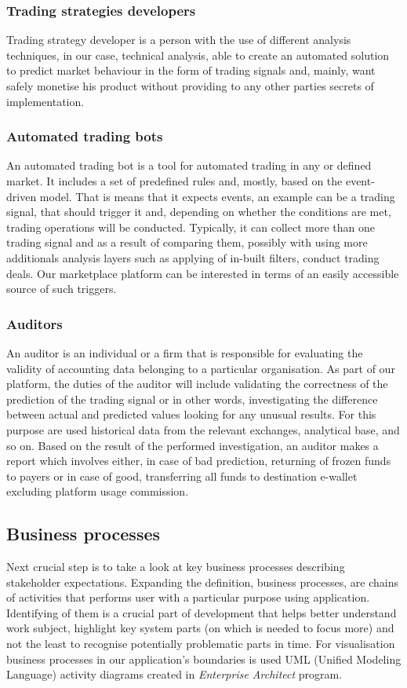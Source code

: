 \documentclass[thesis=B,english]{FITthesis}[2019/03/06]
\begin{document}
\subsubsection*{Trading strategies developers}
Trading strategy developer is a person with the use of different analysis techniques, in our case, technical analysis, able to create an automated solution to predict market behaviour in the form of trading signals and, mainly, want safely monetise his product without providing to any other parties secrets of implementation.

\subsubsection*{Automated trading bots}
An automated trading bot is a tool for automated trading in any or defined market. It includes a set of predefined rules and, mostly, based on the event-driven model. That is means that it expects events, an example can be a trading signal, that should trigger it and, depending on whether the conditions are met, trading operations will be conducted.  Typically, it can collect more than one trading signal and as a result of comparing them, possibly with using more additionals analysis layers such as applying of in-built filters, conduct trading deals. Our marketplace platform can be interested in terms of an easily accessible source of such triggers.  

\subsubsection*{Auditors}
An auditor is an individual or a firm that is responsible for evaluating the validity of accounting data belonging to a particular organisation.
As part of our platform, the duties of the auditor will include validating the correctness of the prediction of the trading signal or in other words, investigating the difference between actual and predicted values looking for any unusual results. For this purpose are used historical data from the relevant exchanges, analytical base, and so on. 
Based on the result of the performed investigation, an auditor makes a report which involves either, in case of bad prediction, returning of frozen funds to payers or in case of good, transferring all funds to destination e-wallet excluding platform usage commission.


\subsection{Business processes}
Next crucial step is to take a look at key business processes describing stakeholder expectations. Expanding the definition, business processes, are chains of activities that performs user with a particular purpose using application. Identifying of them is a crucial part of development that helps better understand work subject, highlight key system parts (on which is needed to focus more) and not the least to recognise potentially problematic parts in time. For visualisation business processes in our application's boundaries is used UML (Unified  Modeling  Language) activity diagrams created in \textit{Enterprise Architect} program.
\end{document}
